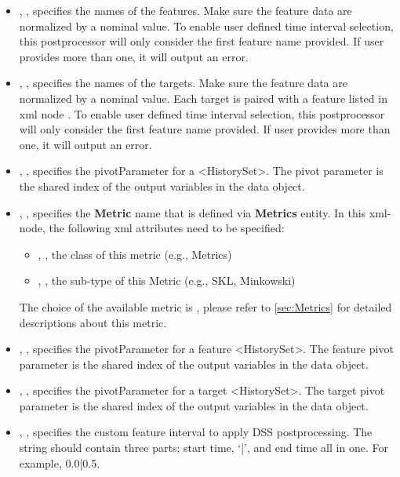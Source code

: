 \begin{itemize}
  \item {}, , specifies the names of the features. Make sure the feature data are normalized by a nominal value.
    To enable user defined time interval selection, this postprocessor will only consider the first feature name provided. If user provides more than one,
    it will output an error.
  \item {}, , specifies the names of the targets. Make sure the feature data are normalized by a nominal value. \nb Each target is paired with a feature listed in xml node .
    To enable user defined time interval selection, this postprocessor will only consider the first feature name provided. If user provides more than one,
    it will output an error.
  \item {}, , specifies the pivotParameter for a <HistorySet>.
    The pivot parameter is the shared index of the output variables in the data object.
  \item {}, , specifies the \textbf{Metric} name that is defined via
    \textbf{Metrics} entity. In this xml-node, the following xml attributes need to be specified:
    \begin{itemize}
      \item {}, , the class of this metric (e.g., Metrics)
      \item {}, , the sub-type of this Metric (e.g., SKL, Minkowski)
    \end{itemize}
    \nb The choice of the available metric is , please
    refer to \ref{sec:Metrics} for detailed descriptions about this metric.
    \item {}, , specifies the pivotParameter for a feature <HistorySet>. The feature pivot parameter is the shared index of the output variables in the data object.
    \item {}, , specifies the pivotParameter for a target <HistorySet>. The target pivot parameter is the shared index of the output variables in the data object.
    \item {}, , specifies the custom feature interval to apply DSS postprocessing. The string should contain three parts; start time, `|', and end time all in one. For example, 0.0|0.5.

\end{itemize}
